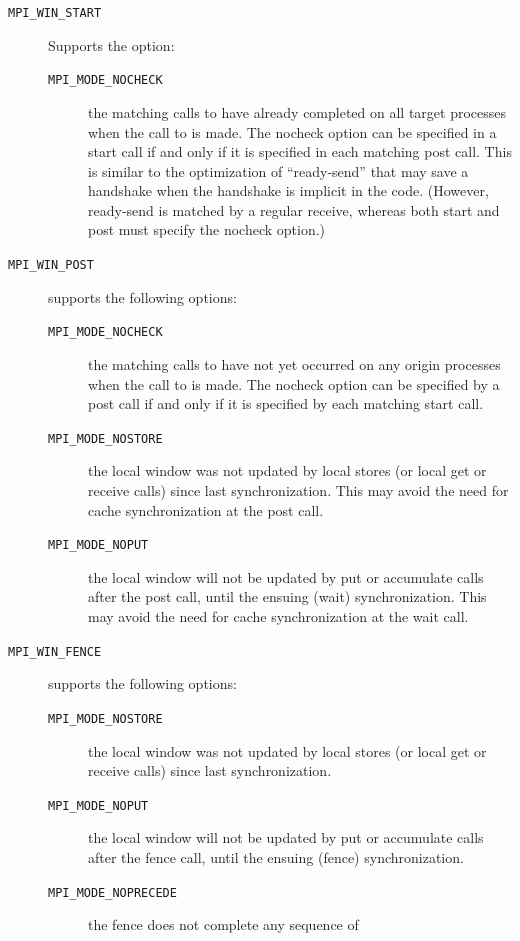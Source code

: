 \begin{description}
\item[\texttt{MPI\_WIN\_START}] Supports the option:
  \begin{description}
    \item[\texttt{MPI\_MODE\_NOCHECK}] the matching calls to  have already
    completed on all target processes when the call to  is
    made. The nocheck option can be specified in a start call if and
    only if it is specified in each matching post call. This is similar
    to the optimization of ``ready-send'' that may save a handshake when
    the handshake is implicit in the code. (However, ready-send is
    matched by a regular receive, whereas both start and post must
    specify the nocheck option.)
  \end{description}
\item[\texttt{MPI\_WIN\_POST}] supports the following options:
  \begin{description}
  \item[\texttt{MPI\_MODE\_NOCHECK}] the matching calls to  have not
    yet occurred on any origin processes when the call to 
    is made. The nocheck option can be specified by a post call if and
    only if it is specified by each matching start call.
  \item[\texttt{MPI\_MODE\_NOSTORE}] the local window was not updated by local
    stores (or local get or receive calls) since last
    synchronization. This may avoid the need for cache synchronization
    at the post call.
  \item[\texttt{MPI\_MODE\_NOPUT}] the local window will not be updated by put or
    accumulate calls after the post call, until the ensuing (wait)
    synchronization. This may avoid the need for cache synchronization
    at the wait call.
  \end{description}
\item[\texttt{MPI\_WIN\_FENCE}] supports the following options:
  \begin{description}
  \item[\texttt{MPI\_MODE\_NOSTORE}] the local window was not updated by local
    stores (or local get or receive calls) since last synchronization.
  \item[\texttt{MPI\_MODE\_NOPUT}] the local window will not be updated by put or
    accumulate calls after the fence call, until the ensuing (fence)
    synchronization.
  \item[\texttt{MPI\_MODE\_NOPRECEDE}] the fence does not complete any sequence of

\end{description}
\end{description}
